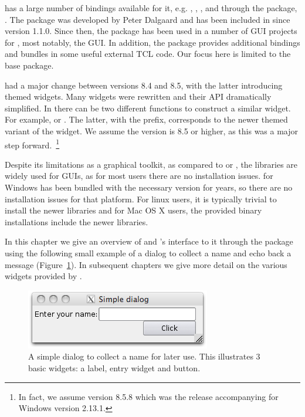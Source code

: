 \TK\/ has a large number of bindings available for it,
e.g. , , , and through
the  package, \R. The  package was developed by
Peter Dalgaard and has been included in \R\/ since version 1.1.0. Since then,
the package has been used in a number of GUI projects for \R, most
notably, the  GUI. In addition, the  package
provides additional bindings and bundles in some useful external TCL
code. Our focus here is limited to the base  package.

\TK\/ had a major change between versions 8.4 and 8.5, with the latter
introducing themed widgets. Many widgets were rewritten and their API
dramatically simplified. In  there can be two different
functions to construct a similar widget. For example,
 or . The latter, with the
 prefix, corresponds to the newer themed variant of the
widget. We assume the \TK\/ version is 8.5 or higher, as this was a
major step forward.~\footnote{In fact, we assume version 8.5.8 which
  was the release accompanying \R{} for Windows version 2.13.1.}

Despite its limitations as a graphical toolkit, as compared to \GTK\/
or \Qt, the \TK\/ libraries are widely used for \R\/ GUIs, as for most
users there are no installation issues. \R\/ for Windows has been
bundled with the necessary \TK\/ version for years, so there are no
installation issues for that platform. For linux users, it is
typically trivial to install the newer libraries and for Mac OS X
users, the provided binary installations include the newer \TK\/
libraries.


In this chapter we give an overview of \Tk\/ and \R's interface to
it through the  package using the following
small example of a dialog to collect a name and echo
back a message (Figure~\ref{fig:tcltk-simple-dialog}). In subsequent chapters we give more detail on the
various widgets provided by \Tk.

\begin{figure}
  \centering
  \includegraphics[width=.6\textwidth]{fig-tcltk-themed-dialog.png}
  \caption{A simple dialog to collect a name for later use. This illustrates 3 basic widgets: a label, entry widget and button.}
  \label{fig:tcltk-simple-dialog}
\end{figure}


